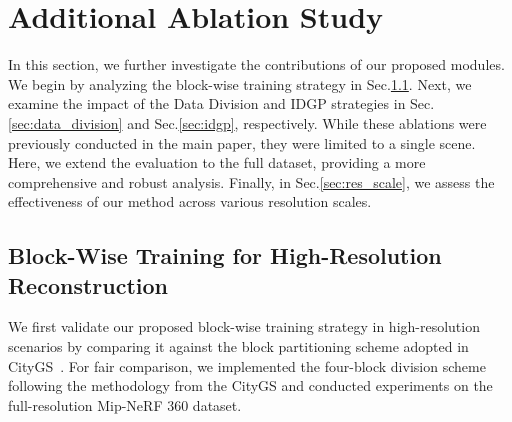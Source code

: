 \section{Additional Ablation Study}
In this section, we further investigate the contributions of our proposed modules. We begin by analyzing the block-wise training strategy in Sec.\ref{sec:block_training}. Next, we examine the impact of the Data Division and IDGP strategies in Sec.\ref{sec:data_division} and Sec.\ref{sec:idgp}, respectively. While these ablations were previously conducted in the main paper, they were limited to a single scene. Here, we extend the evaluation to the full dataset, providing a more comprehensive and robust analysis. Finally, in Sec.\ref{sec:res_scale}, we assess the effectiveness of our method across various resolution scales.

\subsection{ Block-Wise Training for High-Resolution Reconstruction}
\label{sec:block_training}
We first validate our proposed block-wise training strategy in high-resolution scenarios by comparing it against the block partitioning scheme adopted in CityGS~\cite{Citygs}.
For fair comparison, we implemented the four-block division scheme following the methodology from the CityGS and conducted experiments on the full-resolution Mip-NeRF 360 dataset.


